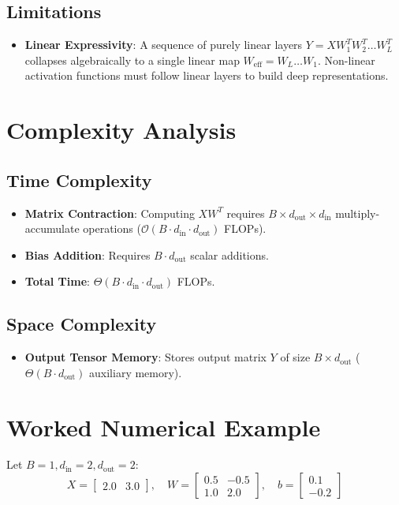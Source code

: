 \documentclass[11pt,a4paper]{article}
\theoremstyle{definition}
\begin{document}
\subsection{Limitations}
\begin{itemize}
    \item \textbf{Linear Expressivity}: A sequence of purely linear layers $Y = X W_1^T W_2^T \dots W_L^T$ collapses algebraically to a single linear map $W_{\text{eff}} = W_L \dots W_1$. Non-linear activation functions must follow linear layers to build deep representations.
\end{itemize}

\section{Complexity Analysis}

\subsection{Time Complexity}
\begin{itemize}
    \item \textbf{Matrix Contraction}: Computing $X W^T$ requires $B \times d_{\text{out}} \times d_{\text{in}}$ multiply-accumulate operations ($\mathcal{O}(B \cdot d_{\text{in}} \cdot d_{\text{out}})$ FLOPs).
    \item \textbf{Bias Addition}: Requires $B \cdot d_{\text{out}}$ scalar additions.
    \item \textbf{Total Time}: $\Theta(B \cdot d_{\text{in}} \cdot d_{\text{out}})$ FLOPs.
\end{itemize}

\subsection{Space Complexity}
\begin{itemize}
    \item \textbf{Output Tensor Memory}: Stores output matrix $Y$ of size $B \times d_{\text{out}}$ ($\Theta(B \cdot d_{\text{out}})$ auxiliary memory).
\end{itemize}

\section{Worked Numerical Example}

Let $B=1, d_{\text{in}}=2, d_{\text{out}}=2$:
\begin{equation}
X = \begin{bmatrix} 2.0 & 3.0 \end{bmatrix}, \quad W = \begin{bmatrix} 0.5 & -0.5 \\ 1.0 & 2.0 \end{bmatrix}, \quad b = \begin{bmatrix} 0.1 \\ -0.2 \end{bmatrix}
\end{equation}
\end{document}

